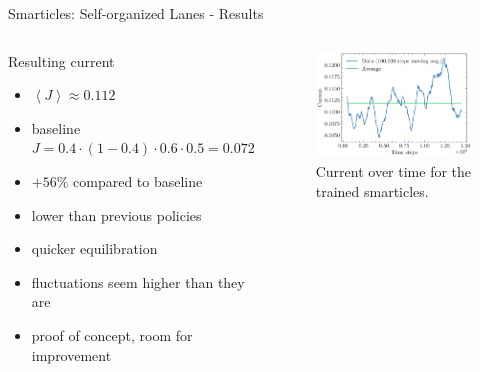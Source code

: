 \documentclass[10pt,xcolor=table, aspectratio=1610]{beamer}
\begin{document}
\begin{frame}{Smarticles: Self-organized Lanes - Results}
  \begin{columns}
    \begin{block}{Resulting current}
      \begin{itemize}
        \item $\left\langle J \right\rangle \approx 0.112$
        \item baseline $J=0.4\cdot(1-0.4)\cdot0.6\cdot0.5=0.072$
        \item $+56\%$ compared to baseline
        \item lower than previous policies
        \item quicker equilibration
        \item fluctuations seem higher than they are
        \item proof of concept, room for improvement
      \end{itemize}
    \end{block}
    \begin{figure}
        \includegraphics[width=\textwidth]{../Thesis/img/results/lanes_current.pdf}
        \caption*{Current over time for the trained smarticles.}
      \end{figure}
  \end{columns}
\end{frame}
\end{document}

